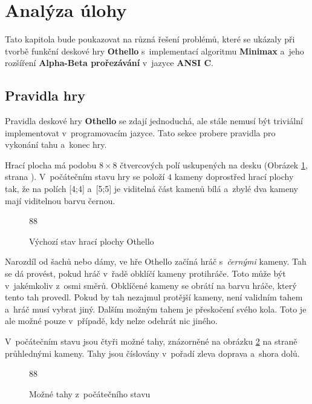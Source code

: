 \section{Analýza úlohy}

Tato kapitola bude poukazovat na různá řešení problémů, které se ukázaly při tvorbě funkční deskové hry \textbf{Othello} s~implementací algoritmu \textbf{Minimax} a~jeho rozšíření \textbf{Alpha-Beta prořezávání} v~jazyce \textbf{ANSI C}.

\subsection{Pravidla hry}

Pravidla deskové hry \textbf{Othello} se zdají jednoduchá, ale stále nemusí být triviální implementovat v~programovacím jazyce. Tato sekce probere pravidla pro vykonání tahu a~konec hry.

Hrací plocha má podobu $8\times8$ čtvercových polí uskupených na desku (Obrázek \ref{img:board_init}, strana \pageref{img:board_init}). V~počátečním stavu hry se položí $4$ kameny doprostřed hrací plochy tak, že na polích [4;4] a~[5;5] je viditelná část kamenů bílá a~zbylé dva kameny mají viditelnou barvu černou.

\begin{figure}[h]
	\centering

	\begin{othellogame}{8}{8}
	\end{othellogame}

	\caption{Výchozí stav hrací plochy Othello}
	\label{img:board_init}
\end{figure}

Narozdíl od šachů nebo dámy, ve hře Othello začíná hráč s~\emph{černými} kameny. Tah se dá provést, pokud hráč v~řadě obklíčí kameny protihráče. Toto může být v~jakémkoliv z~osmi směrů. Obklíčené kameny se obrátí na barvu hráče, který tento tah provedl. Pokud by tah nezajmul protější kameny, není validním tahem a~hráč musí vybrat jiný. Dalším možným tahem je přeskočení svého kola. Toto je ale možné pouze v~případě, kdy nelze odehrát nic jiného.

V~počátečním stavu jsou čtyři možné tahy, znázorněné na obrázku \ref{img:board_moves} na straně \pageref{img:board_moves} průhlednými kameny. Tahy jsou číslovány v~pořadí zleva doprava a~shora dolů.

\begin{figure}[h]
	\centering

	\begin{othellogame}{8}{8}
		
	\end{othellogame}

	\caption{Možné tahy z~počátečního stavu}
	\label{img:board_moves}
\end{figure}

